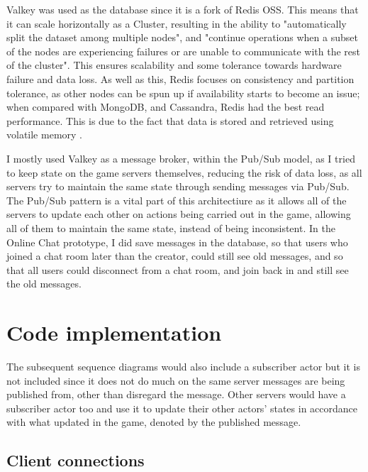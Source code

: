 \documentclass[]{interim}
\begin{document}
Valkey was used as the database since it is a fork of Redis OSS.
This means that it can scale horizontally as a Cluster, resulting in
the ability to "automatically split the dataset among multiple nodes", and
"continue operations when a subset of the nodes are experiencing failures
or are unable to communicate with the rest of the cluster"\cite{noauthor_scale_nodate}.
This ensures scalability and some tolerance towards hardware failure and data loss.
As well as this, Redis focuses on consistency and partition tolerance, as other nodes
can be spun up if availability starts to become an issue; when compared with
MongoDB, and Cassandra, Redis had the best read performance. This is due to the fact that data is stored and retrieved using
volatile memory \cite{department_of_information_systems_university_of_nizwa_sultanate_of_oman_study_2022}.

I mostly used Valkey as a message broker, within the Pub/Sub model, as I
tried to keep state on the game servers themselves, reducing the risk of data
loss, as all servers try to maintain the same state through sending messages
via Pub/Sub. The Pub/Sub pattern is a vital part of this architectiure as it
allows all of the servers to update each other on actions being carried out
in the game, allowing all of them to maintain the same state,
instead of being inconsistent. In the Online Chat prototype,
I did save messages in the database, so that users who joined
a chat room later than the creator, could still see old messages, and so that all
users could disconnect from a chat room, and join back in and still see the old
messages.

\newpage

\section{Code implementation}

The subsequent sequence diagrams would also include a subscriber actor
but it is not included since it does not do much on the same server
messages are being published from, other than disregard the message.
Other servers would have a subscriber actor too and use it to update
their other actors' states in accordance with what updated in the game,
denoted by the published message.

\subsection{Client connections}
\end{document}
